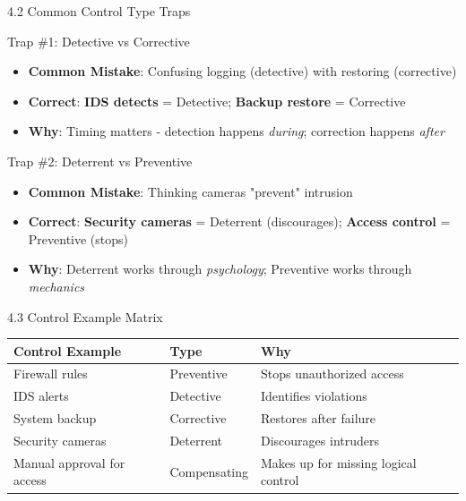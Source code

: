 \documentclass{beamer}
\begin{document}
	\begin{frame}{4.2 Common Control Type Traps}
		\begin{block}{Trap \#1: Detective vs Corrective}
			\begin{itemize}
				\item \textbf{Common Mistake}: Confusing logging (detective) with restoring (corrective)
				\item \textbf{Correct}: \textbf{IDS detects} = Detective; \textbf{Backup restore} = Corrective
				\item \textbf{Why}: Timing matters - detection happens \textit{during}; correction happens \textit{after}
			\end{itemize}
		\end{block}
		
		\begin{block}{Trap \#2: Deterrent vs Preventive}
			\begin{itemize}
				\item \textbf{Common Mistake}: Thinking cameras "prevent" intrusion
				\item \textbf{Correct}: \textbf{Security cameras} = Deterrent (discourages); \textbf{Access control} = Preventive (stops)
				\item \textbf{Why}: Deterrent works through \textit{psychology}; Preventive works through \textit{mechanics}
			\end{itemize}
		\end{block}
	\end{frame}
	
	\begin{frame}{4.3 Control Example Matrix}
		\begin{table}
			\centering
			\begin{tabular}{|p{3cm}|p{4cm}|p{4cm}|}
				\hline
				\textbf{Control Example} & \textbf{Type} & \textbf{Why} \\
				\hline
				Firewall rules & Preventive & Stops unauthorized access \\
				\hline
				IDS alerts & Detective & Identifies violations \\
				\hline
				System backup & Corrective & Restores after failure \\
				\hline
				Security cameras & Deterrent & Discourages intruders \\
				\hline
				Manual approval for access & Compensating & Makes up for missing logical control \\
				\hline
			\end{tabular}
		\end{table}
	\end{frame}
	
\end{document}
